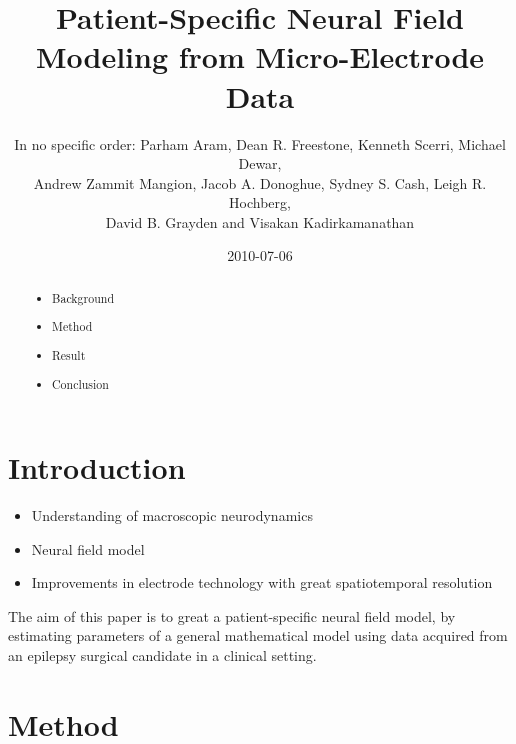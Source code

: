 \documentclass[]{article}
\title{Patient-Specific Neural Field Modeling from Micro-Electrode Data}
\author{In no specific order: Parham Aram, Dean R. Freestone, Kenneth Scerri, Michael Dewar,\\
 Andrew Zammit Mangion, Jacob A. Donoghue, Sydney S. Cash, Leigh R. Hochberg,\\
 David B. Grayden and Visakan Kadirkamanathan  }
\date{2010-07-06}
\begin{document}
\ifpdf
{}
\else
{}
\fi

\maketitle


\begin{abstract}
	
	\begin{itemize}
		\item Background
		\item Method
		\item Result
		\item Conclusion
	\end{itemize}
\end{abstract}

\section{Introduction}
\begin{itemize}
	\item Understanding of macroscopic neurodynamics
	\item Neural field model
	\item Improvements in electrode technology with great spatiotemporal resolution
\end{itemize}
The aim of this paper is to great a patient-specific neural field model, by estimating parameters of a general mathematical model using data acquired from an epilepsy surgical candidate in a clinical setting. 
\section{Method}
\end{document}
